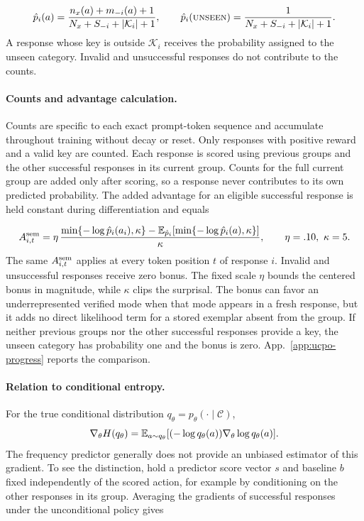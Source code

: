 \begin{equation}
  \hat p_i(a)=\frac{n_x(a)+m_{-i}(a)+1}{N_x+S_{-i}+|\mathcal K_i|+1},\qquad
  \hat p_i(\textsc{unseen})=\frac{1}{N_x+S_{-i}+|\mathcal K_i|+1}.
  \label{eq:open-set-predictor}
\end{equation}
A response whose key is outside $\mathcal K_i$ receives the probability
assigned to the unseen category. Invalid and unsuccessful responses do not
contribute to the counts.

\paragraph{Counts and advantage calculation.}
Counts are specific to each exact prompt-token sequence and accumulate
throughout training without decay or reset. Only responses with positive
reward and a valid key are counted. Each response is scored using previous
groups and the other successful responses in its current group. Counts for
the full current group are added only after scoring, so a response never
contributes to its own predicted probability.
The added advantage for an eligible successful response is held constant
during differentiation and equals

\begin{equation}
  A^{\rm sem}_{i,t}=\eta\,
  \frac{\min\{-\log\hat p_i(a_i),\kappa\}
    -\mathbb E_{\hat p_i}[\min\{-\log\hat p_i(a),\kappa\}]}{\kappa},
  \qquad \eta=.10,\ \kappa=5.
  \label{eq:legacy-semantic-advantage}
\end{equation}
The same $A^{\rm sem}_{i,t}$ applies at every token position $t$ of response
$i$. Invalid and unsuccessful responses receive zero bonus. The fixed scale
$\eta$ bounds the centered bonus in magnitude, while $\kappa$ clips the
surprisal. The bonus can favor an underrepresented verified mode when that
mode appears in a fresh response, but it adds no direct likelihood term for
a stored exemplar absent from the group. If neither previous groups nor the other
successful responses provide a key, the unseen category has probability one
and the bonus is zero. App.~\ref{app:ucpo-progress} reports the comparison.

\paragraph{Relation to conditional entropy.}

For the true conditional distribution $q_\theta=p_\theta(\cdot\mid\mathcal C)$,
\begin{equation}
 \nabla_\theta H(q_\theta)
 =\mathbb E_{a\sim q_\theta}[(-\log q_\theta(a))\nabla_\theta\log q_\theta(a)].
 \label{eq:entropy-score-function}
\end{equation}
The frequency predictor generally does not provide an unbiased estimator
of this gradient. To see the distinction, hold a predictor score vector $s$
and baseline $b$ fixed independently of the scored action, for example by
conditioning on the other responses in its group. Averaging the gradients
of successful responses under the unconditional policy gives

